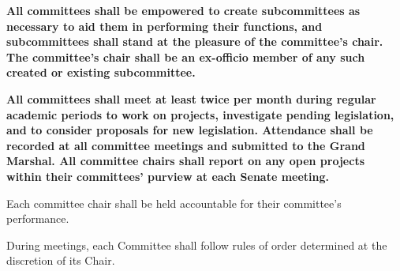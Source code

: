 \begin{enumerate}
    \item { \bf All committees shall be empowered to create subcommittees as necessary to aid them in performing their functions, and subcommittees shall stand at the pleasure of the committee's chair. The committee's chair shall be an ex-officio member of any such created or existing subcommittee. }

    \item { \bf All committees shall meet at least twice per month during regular academic periods to work on projects, investigate pending legislation, and to consider proposals for new legislation. Attendance shall be recorded at all committee meetings and submitted to the Grand Marshal. All committee chairs shall report on any open projects within their committees' purview at each Senate meeting. }

    \item Each committee chair shall be held accountable for their committee's performance.

    { \bf \item During meetings, each Committee shall follow rules of order determined at the discretion of its Chair. }

    

    

    

    

    

    

    

    

    { \bf  }

\end{enumerate}

